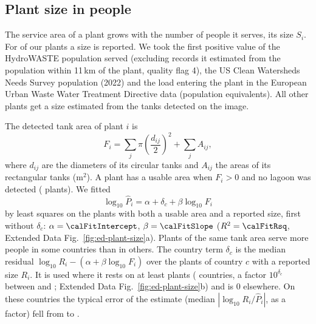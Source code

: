 

\subsection*{Plant size in people}

The service area of a plant grows with the number of people it serves, its size $S_i$.
For \calPlantsReported{} of our \calPlantsAll{} plants a size is reported. We took the first positive
value of the HydroWASTE population served\cite{hydrowaste} (excluding records it estimated from the
population within 11\,km of the plant, quality flag 4), the US Clean Watersheds Needs Survey population
(2022)\cite{cwns2022} and the load entering the plant in the European Urban Waste Water Treatment
Directive data (population equivalents)\cite{uwwtd}. All other plants get a size estimated from the tanks detected on the image.

The detected tank area of plant $i$ is
\begin{equation}
  F_i = \sum_{j} \pi \left(\frac{d_{ij}}{2}\right)^{2} + \sum_{j} A_{ij},
  \label{eq:tank-area}
\end{equation}
where $d_{ij}$ are the diameters of its circular tanks and $A_{ij}$ the areas of its rectangular tanks
(m$^2$). A plant has a usable area when $F_i>0$ and no lagoon was detected (\calPlantsSized{} plants).
We fitted
\begin{equation}
  \log_{10} \hat{P}_i = \alpha + \delta_c + \beta \log_{10} F_i
  \label{eq:size}
\end{equation}
by least squares on the \calFitPlants{} plants with both a usable area and a reported size, first
without $\delta_c$: $\alpha=\calFitIntercept$, $\beta=\calFitSlope$ ($R^2=\calFitRsq$,
Extended Data Fig.~\ref{fig:ed-plant-size}a). Plants of the same tank area serve more people in some
countries than in others. The country term $\delta_c$ is the median residual
$\log_{10} R_i - (\alpha + \beta \log_{10} F_i)$ over the plants of country $c$ with a reported size
$R_i$. It is used where it rests on at least \calOffsetMinPlants{} plants (\calOffsetCountries{}
countries, a factor $10^{\delta_c}$ between \calOffsetMin{} and \calOffsetMax{}; Extended Data
Fig.~\ref{fig:ed-plant-size}b) and is 0 elsewhere. On these countries the typical error of the estimate
(median $|\log_{10} R_i/\hat P_i|$, as a factor) fell from \calEstimateErrorBefore{} to
\calEstimateErrorAfter.

